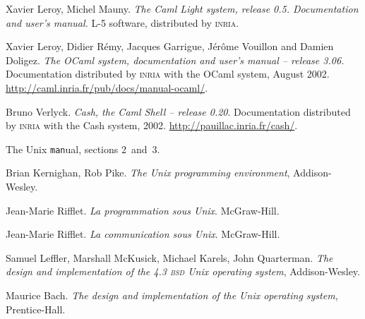 %
%

\renewcommand{\bibname}{{参考文献}}
\begin{thebibliography}{9}


Xavier Leroy, Michel Mauny. \emph{The Caml Light system, release 0.5.
Documentation and user's manual.} L-5 software, distributed by \textsc{inria}.

Xavier Leroy, Didier Rémy, Jacques Garrigue, Jérôme Vouillon and
Damien Doligez.
\emph{The {OCaml} system,
documentation and user's manual -- release 3.06.}
Documentation distributed by \textsc{inria} with the OCaml
system, August 2002.
\url{http://caml.inria.fr/pub/docs/manual-ocaml/}.

Bruno Verlyck.
\emph{Cash, the Caml Shell -- release 0.20}.
Documentation distributed by \textsc{inria} with the Cash system, 2002.
\url{http://pauillac.inria.fr/cash/}.


The Unix \texttt{man}ual, sections 2~and~3.

Brian Kernighan, Rob Pike. \emph{The Unix programming
environment}, Addison-Wesley.

Jean-Marie Rifflet. \emph{La programmation sous Unix}. McGraw-Hill.

Jean-Marie Rifflet. \emph{La communication sous Unix}. McGraw-Hill.


Samuel Leffler, Marshall McKusick, Michael Karels, John Quarterman.
\emph{The design and implementation of the 4.3 \textsc{bsd}
 Unix operating system},
Addison-Wesley.

Maurice Bach. \emph{The design and implementation of the Unix operating
system}, Prentice-Hall.


\end{thebibliography}
